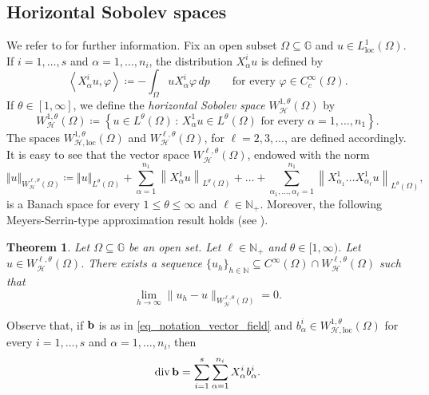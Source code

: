 \documentclass[11pt]{amsart}
\newcommand{\hhh}{{\mathcal{H}}}
\newcommand{\bb}{{\bf {b}}} %
\newcommand{\Om}{\Omega}
\DeclareMathOperator{\divv}{div}
\theoremstyle{plain}
\newtheorem{theorem}{Theorem}[section]
\theoremstyle{definition}
\theoremstyle{remark}
\numberwithin{equation}{section}
\begin{document}
\subsection{Horizontal Sobolev spaces}
We refer to \cite{MR494315,MR4544986} for further information. Fix an open subset $\Om\subseteq \mathbb{G}$ and $u\in L^1_{\mathrm{loc}}(\Om)$. If $i=1,\dots,s$ and $\alpha=1,\dots,n_i$, the distribution $X^i_\alpha u$ is defined by 
\begin{equation*}
\left\langle X^i_\alpha u,\varphi\right\rangle \coloneqq -\int_\Om u X^i_\alpha \varphi\,dp \qquad \text{for every $\varphi\in C^\infty_c(\Om)$}.
\end{equation*}
If $\theta\in[1,\infty]$, we define the \emph{horizontal Sobolev space} $W^{1,\theta}_\hhh(\Om)$ by
\begin{equation*}
W^{1,\theta}_\hhh(\Om)\coloneqq \left\{u\in L^\theta(\Om)\,:\,X^1_\alpha u\in L^\theta(\Om)\text{ for every $\alpha=1,\dots,n_1$}\right\}.
\end{equation*}
The spaces $W^{1,\theta}_{\hhh,\mathrm{loc}}(\Om)$ and $W^{\ell,\theta}_\hhh(\Om)$, for $\ell=2,3,\ldots$, are defined accordingly. It is easy to see that the vector space $W^{\ell,\theta}_\hhh(\Om)$, endowed with the norm
\[
\Vert u\Vert_{W^{\ell,\theta}_\hhh(\Om)}\coloneqq\Vert u\Vert_{L^\theta(\Om)}+ \sum_{\alpha=1}^{n_1} \left\|X^1_\alpha u\right\|_{L^\theta(\Om)}+\dots+\sum_{\alpha_1,\ldots,\alpha_\ell=1}^{n_1} \left\|X^1_{\alpha_1}\ldots X^1_{\alpha_\ell} u \right\|_{L^\theta(\Om)},
\]
is a Banach space for every $1\leq \theta \leq \infty$ and $\ell \in \mathbb N_+$. Moreover, the following Meyers-Serrin-type approximation result holds (see \cite[Theorem A.2]{MR1404326}). 
\begin{theorem} \label{meyersserrin}
    Let $\Om\subseteq \mathbb{G}$ be an open set. Let $\ell \in\mathbb N_+$ and $\theta \in [1,\infty)$. Let $u\in W^{\ell,\theta}_\hhh(\Om)$. There exists a sequence $\{u_h\}_{h\in\mathbb N}\subseteq C^\infty(\Om)\cap W^{\ell,\theta}_\hhh(\Om)$ such that 
    \begin{equation*}
        \lim_{h\to\infty }\|u_h-u\|_{W^{\ell,\theta}_\hhh(\Om)}=0.
    \end{equation*}
\end{theorem}
Observe that, if $\bb$ is as in \eqref{eq_notation_vector_field} and $b^i_\alpha \in W^{1,\theta}_{\hhh,\mathrm{loc}}(\Om)$ for every $i=1,\dots,s$ and $\alpha=1,\dots,n_i$, then
\begin{equation} \label{eq_divergence}
\divv \bb = \sum_{i=1}^s \sum_{\alpha=1}^{n_i} X^i_\alpha b^i_\alpha.
\end{equation} 
\end{document}

